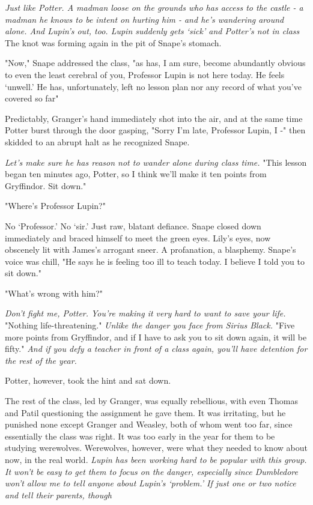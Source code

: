 \emph{Just like Potter. A madman loose on the grounds who has access to the castle - a madman he knows to be intent on hurting him - and he's wandering around alone. And Lupin's out, too. Lupin suddenly gets `sick' and Potter's not in class{\el}} The knot was forming again in the pit of Snape's stomach.

"Now," Snape addressed the class, "as has, I am sure, become abundantly obvious to even the least cerebral of you, Professor Lupin is not here today. He feels `unwell.' He has, unfortunately, left no lesson plan nor any record of what you've covered so far{\el}"

Predictably, Granger's hand immediately shot into the air, and at the same time Potter burst through the door gasping, "Sorry I'm late, Professor Lupin, I -" then skidded to an abrupt halt as he recognized Snape.

\emph{Let's make sure he has reason not to wander alone during class time.} "This lesson began ten minutes ago, Potter, so I think we'll make it ten points from Gryffindor. Sit down."

"Where's Professor Lupin?"

No `Professor.' No `sir.' Just raw, blatant defiance. Snape closed down immediately and braced himself to meet the green eyes. Lily's eyes, now obscenely lit with James's arrogant sneer. A profanation, a blasphemy. Snape's voice was chill, "He says he is feeling too ill to teach today. I believe I told you to sit down."

"What's wrong with him?"

\emph{Don't fight me, Potter. You're making it very hard to want to save your life.} "Nothing life-threatening." \emph{Unlike the danger you face from Sirius Black.} "Five more points from Gryffindor, and if I have to ask you to sit down again, it will be fifty." \emph{And if you defy a teacher in front of a class again, you'll have detention for the rest of the year.}

Potter, however, took the hint and sat down.

The rest of the class, led by Granger, was equally rebellious, with even Thomas and Patil questioning the assignment he gave them. It was irritating, but he punished none except Granger and Weasley, both of whom went too far, since essentially the class was right. It was too early in the year for them to be studying werewolves. Werewolves, however, were what they needed to know about now, in the real world. \emph{Lupin has been working hard to be popular with this group. It won't be easy to get them to focus on the danger, especially since Dumbledore won't allow me to tell anyone about Lupin's `problem.' If just one or two notice and tell their parents, though{\el}}

